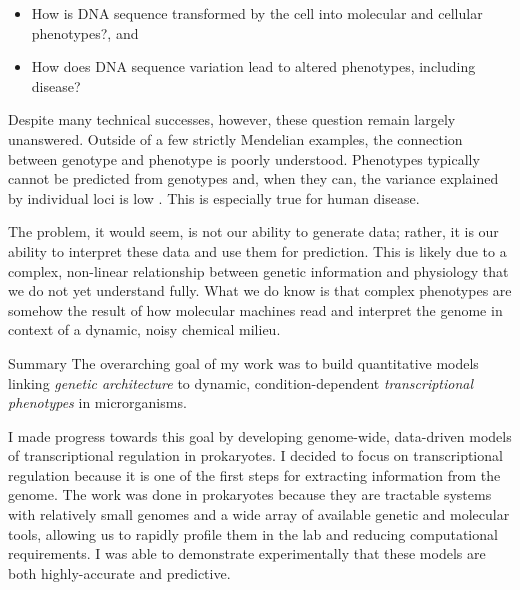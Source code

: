 \documentclass{article}
\newenvironment{gbar}[1]{ %
\def\FrameCommand{{\color{#1}\vrule width 3 pt } \colorbox{light-gray}}%
\MakeFramed{\advance\hsize-\width\FrameRestore }}%
{\endMakeFramed}
\begin{document}
{
\begin{itemize}
	\item How is DNA sequence transformed by the cell into molecular and cellular phenotypes?, and
	\item How does DNA sequence variation lead to altered phenotypes, including disease?
\end{itemize}
}

Despite many technical successes, however, these question remain largely unanswered. Outside of a few strictly Mendelian examples, the connection between genotype and phenotype is poorly understood. Phenotypes typically cannot be predicted from genotypes and, when they can, the variance explained by individual loci is low \cite{manolio_finding_2009}. This is especially true for human disease.  

The problem, it would seem, is not our ability to generate data; rather, it is our ability to interpret these data and use them for prediction. This is likely due to a complex, non-linear relationship between genetic information and physiology that we do not yet understand fully. What we do know is that complex phenotypes are somehow the result of how molecular machines read and interpret the genome in context of a dynamic, noisy chemical milieu.\\

\begin{bclogo}[logo =\bcoeil , barre = none , noborder = true]{Summary}%
\begin{gbar}{blue}
{
The overarching goal of my work was to build quantitative models linking \textit{genetic architecture} to dynamic, condition-dependent \textit{transcriptional phenotypes} in microrganisms.
}
\end{gbar}
\end{bclogo}
\vspace{5mm}

\noindent I made progress towards this goal by developing genome-wide, data-driven models of transcriptional regulation in prokaryotes.  I decided to focus on transcriptional regulation because it is one of the first steps for extracting information from the genome.  The work was done in prokaryotes because they are tractable systems with relatively small genomes and a wide array of available genetic and molecular tools, allowing us to rapidly profile them in the lab and reducing computational requirements. I was able to demonstrate experimentally that these models are both highly-accurate and predictive. 
\end{document}
